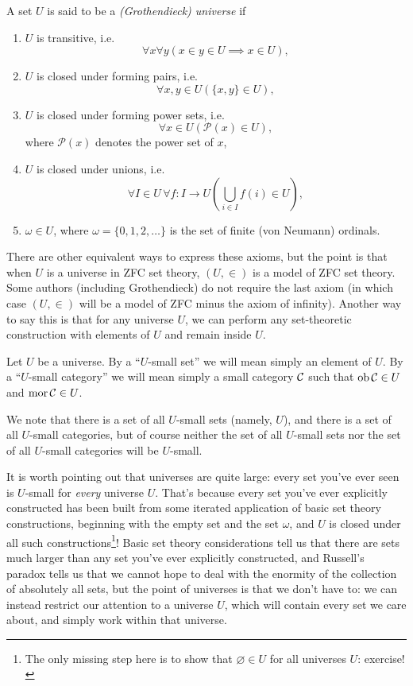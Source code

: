 \begin{definition}\label{def:appendix:size issues:universe}
    A set $U$ is said to be a \emph{(Grothendieck) universe} if
    \begin{enumerate}
        \item $U$ is transitive, i.e.
              \[\forall x \forall y (x \in y \in U \implies x \in U),\]
        \item $U$ is closed under forming pairs, i.e.
              \[\forall x,y \in U (\{x,y\} \in U),\]
        \item $U$ is closed under forming power sets, i.e.
              \[\forall x \in U (\mathcal{P}(x) \in U),\]
              where $\mathcal{P}(x)$ denotes the power set of $x$,
        \item $U$ is closed under unions, i.e.
              \[\forall I \in U \,\forall f : I \to U \left(\bigcup_{i \in I} f(i) \in U\right),\]
        \item $\omega \in U$, where $\omega = \{0,1,2,\dots\}$ is the set of finite (von Neumann) ordinals.
    \end{enumerate}
\end{definition}

There are other equivalent ways to express these axioms, but the point is that when $U$ is a universe in ZFC set theory, $(U,\in)$ is a model of ZFC set theory. Some authors (including Grothendieck) do not require the last axiom (in which case $(U,\in)$ will be a model of ZFC minus the axiom of infinity). Another way to say this is that for any universe $U$, we can perform any set-theoretic construction with elements of $U$ and remain inside $U$.

\begin{definition}\label{def:appendix:size issues:U-small}
    Let $U$ be a universe. By a ``$U$-small set'' we will mean simply an element of $U$. By a ``$U$-small category'' we will mean simply a small category $\mathcal{C}$ such that $\operatorname{ob} \mathcal{C} \in U$ and $\operatorname{mor} \mathcal{C} \in U$.
\end{definition}

We note that there is a set of all $U$-small sets (namely, $U$), and there is a set of all $U$-small categories, but of course neither the set of all $U$-small sets nor the set of all $U$-small categories will be $U$-small.

It is worth pointing out that universes are quite large: every set you've ever seen is $U$-small for \emph{every} universe $U$. That's because every set you've ever explicitly constructed has been built from some iterated application of basic set theory constructions, beginning with the empty set and the set $\omega$, and $U$ is closed under all such constructions\footnote{The only missing step here is to show that $\varnothing \in U$ for all universes $U$: exercise!}! Basic set theory considerations tell us that there are sets much larger than any set you've ever explicitly constructed, and Russell's paradox tells us that we cannot hope to deal with the enormity of the collection of absolutely all sets, but the point of universes is that we don't have to: we can instead restrict our attention to a universe $U$, which will contain every set we care about, and simply work within that universe.

